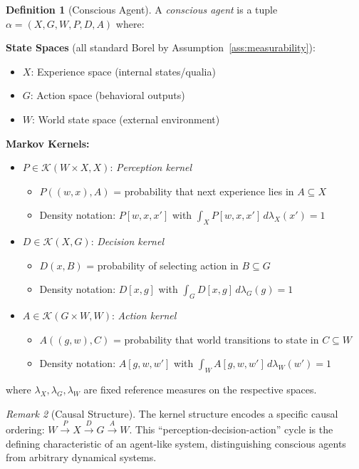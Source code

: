 \documentclass[11pt,a4paper]{article}
\theoremstyle{definition}
\newtheorem{definition}{Definition}[section]
\theoremstyle{plain}
\theoremstyle{remark}
\newtheorem{remark}[definition]{Remark}
\begin{document}
\begin{definition}[Conscious Agent]\label{def:conscious-agent}
A \emph{conscious agent} is a tuple $\alpha = (X, G, W, P, D, A)$ where:

\textbf{State Spaces} (all standard Borel by Assumption~\ref{ass:measurability}):
\begin{itemize}
    \item $X$: Experience space (internal states/qualia)
    \item $G$: Action space (behavioral outputs)
    \item $W$: World state space (external environment)
\end{itemize}

\textbf{Markov Kernels:}
\begin{itemize}
    \item $P \in \mathcal{K}(W \times X, X)$: \emph{Perception kernel}
    \begin{itemize}
        \item $P((w, x), A)$ = probability that next experience lies in $A \subseteq X$
        \item Density notation: $P[w, x, x']$ with $\int_X P[w, x, x'] \, d\lambda_X(x') = 1$
    \end{itemize}

    \item $D \in \mathcal{K}(X, G)$: \emph{Decision kernel}
    \begin{itemize}
        \item $D(x, B)$ = probability of selecting action in $B \subseteq G$
        \item Density notation: $D[x, g]$ with $\int_G D[x, g] \, d\lambda_G(g) = 1$
    \end{itemize}

    \item $A \in \mathcal{K}(G \times W, W)$: \emph{Action kernel}
    \begin{itemize}
        \item $A((g, w), C)$ = probability that world transitions to state in $C \subseteq W$
        \item Density notation: $A[g, w, w']$ with $\int_W A[g, w, w'] \, d\lambda_W(w') = 1$
    \end{itemize}
\end{itemize}
where $\lambda_X, \lambda_G, \lambda_W$ are fixed reference measures on the respective spaces.
\end{definition}

\begin{remark}[Causal Structure]
The kernel structure encodes a specific causal ordering: $W \xrightarrow{P} X \xrightarrow{D} G \xrightarrow{A} W$. This ``perception-decision-action'' cycle is the defining characteristic of an agent-like system, distinguishing conscious agents from arbitrary dynamical systems.
\end{remark}
\end{document}
